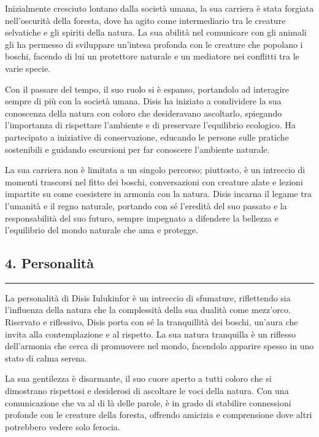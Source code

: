 Inizialmente cresciuto lontano dalla società umana, la sua carriera è
stata forgiata nell'oscurità della foresta, dove ha agito come
intermediario tra le creature selvatiche e gli spiriti della natura. La
sua abilità nel comunicare con gli animali gli ha permesso di sviluppare
un'intesa profonda con le creature che popolano i boschi, facendo di lui
un protettore naturale e un mediatore nei conflitti tra le varie specie.

Con il passare del tempo, il suo ruolo si è espanso, portandolo ad
interagire sempre di più con la società umana. Disis ha iniziato a
condividere la sua conoscenza della natura con coloro che desideravano
ascoltarlo, spiegando l'importanza di rispettare l'ambiente e di
preservare l'equilibrio ecologico. Ha partecipato a iniziative di
conservazione, educando le persone sulle pratiche sostenibili e guidando
escursioni per far conoscere l'ambiente naturale.

La sua carriera non è limitata a un singolo percorso; piuttosto, è un
intreccio di momenti trascorsi nel fitto dei boschi, conversazioni con
creature alate e lezioni impartite su come coesistere in armonia con la
natura. Disis incarna il legame tra l'umanità e il regno naturale,
portando con sé l'eredità del suo passato e la responsabilità del suo
futuro, sempre impegnato a difendere la bellezza e l'equilibrio del
mondo naturale che ama e protegge.

\subsection{4. Personalità}\label{personalituxe0}

\begin{center}\rule{0.5\linewidth}{0.5pt}\end{center}

La personalità di Disis Iulukinfor è un intreccio di sfumature,
riflettendo sia l'influenza della natura che la complessità della sua
dualità come mezz'orco. Riservato e riflessivo, Disis porta con sé la
tranquillità dei boschi, un'aura che invita alla contemplazione e al
rispetto. La sua natura tranquilla è un riflesso dell'armonia che cerca
di promuovere nel mondo, facendolo apparire spesso in uno stato di calma
serena.

La sua gentilezza è disarmante, il suo cuore aperto a tutti coloro che
si dimostrano rispettosi e desiderosi di ascoltare le voci della natura.
Con una comunicazione che va al di là delle parole, è in grado di
stabilire connessioni profonde con le creature della foresta, offrendo
amicizia e comprensione dove altri potrebbero vedere solo ferocia.

